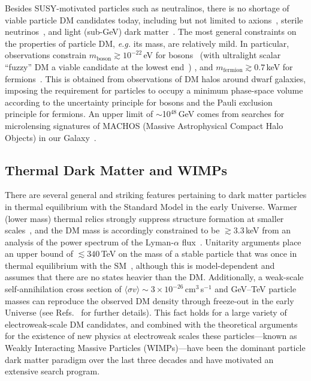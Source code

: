 Besides SUSY-motivated particles such as neutralinos, there is no shortage of viable particle DM candidates today, including but not limited to axions~\cite{PhysRevLett.40.223,Peccei:1977hh}, sterile neutrinos~\cite{Abazajian:2001nj,Seljak:2006qw}, and light (sub-GeV) dark matter~\cite{Feng:2008ya,Lin:2011gj}. The most general constraints on the properties of particle DM, \emph{e.g.} its mass, are relatively mild. In particular, observations constrain $m_\text{boson} \gtrsim 10^{-22}$\,eV for bosons~\cite{Zhang:2017chj} (with ultralight scalar ``fuzzy'' DM a viable candidate at the lowest end~\cite{Hui:2016ltb}) , and $m_\text{fermion} \gtrsim 0.7$\,keV for fermions~\cite{Horiuchi:2013noa}. This is obtained from observations of DM halos around dwarf galaxies, imposing the requirement for particles to occupy a minimum phase-space volume according to the uncertainty principle for bosons and the Pauli exclusion principle for fermions. An upper limit of $\sim$10$^{48}$\,GeV comes from searches for microlensing signatures of MACHOS (Massive Astrophysical Compact Halo Objects) in our Galaxy~\cite{Griest:2013aaa}.

\subsection{Thermal Dark Matter and WIMPs}

There are several general and striking features pertaining to dark matter particles in thermal equilibrium with the Standard Model in the early Universe. Warmer (lower mass) thermal relics strongly suppress structure formation at smaller scales~\cite{Bringmann:2006mu}, and the DM mass is accordingly constrained to be $\gtrsim 3.3$\,keV from an analysis of the power spectrum of the Lyman-$\alpha$ flux~\cite{Viel:2013apy}. Unitarity arguments place an upper bound of $\lesssim340$\,TeV on the mass of a stable particle that was once in thermal equilibrium with the SM~\cite{Griest:1989wd}, although this is model-dependent and assumes that there are no states heavier than the DM. Additionally, a weak-scale self-annihilation cross section of $\langle\sigma v\rangle\sim 3\times10^{-26}$\,cm$^3$\,s$^{-1}$ and GeV--TeV particle masses can reproduce the observed DM density through freeze-out in the early Universe (see Refs.~\cite{1991NuPhB.360..145G,1996PhR...267..195J,Lisanti:2016jxe} for further details). This fact holds for a large variety of electroweak-scale DM candidates, and combined with the theoretical arguments for the existence of new physics at electroweak scales these particles---known as Weakly Interacting Massive Particles (WIMPs)---have been the dominant particle dark matter paradigm over the last three decades and have motivated an extensive search program. 

